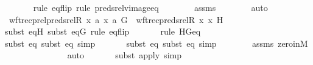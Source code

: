\begin{isabellebody}
\ \ \ \ \ \ \isamarkupfalse%
{\isacharparenleft}{\kern0pt}rule\ eq{\isacharunderscore}{\kern0pt}flip{\isacharcomma}{\kern0pt}\ rule\ preds{\isacharunderscore}{\kern0pt}rel{\isacharunderscore}{\kern0pt}vimage{\isacharunderscore}{\kern0pt}eq{\isacharprime}{\kern0pt}{\isacharparenright}{\kern0pt}\isanewline
\ \ \ \ \ \ \isamarkupfalse%
\ assms\isanewline
\ \ \ \ \ \ \isamarkupfalse%
\ auto\isanewline
\isanewline
\ \ \ \ \isamarkupfalse%
\ {\isachardoublequoteopen}wftrec{\isacharparenleft}{\kern0pt}prel{\isacharparenleft}{\kern0pt}preds{\isacharunderscore}{\kern0pt}rel{\isacharparenleft}{\kern0pt}R{\isacharcomma}{\kern0pt}\ x{\isacharparenright}{\kern0pt}{\isacharcomma}{\kern0pt}\ {\isacharbraceleft}{\kern0pt}a{\isacharbraceright}{\kern0pt}{\isacharparenright}{\kern0pt}{\isacharcomma}{\kern0pt}\ {\isasymlangle}x{\isacharcomma}{\kern0pt}\ a{\isasymrangle}{\isacharcomma}{\kern0pt}\ G{\isacharparenright}{\kern0pt}\ {\isacharequal}{\kern0pt}\ wftrec{\isacharparenleft}{\kern0pt}preds{\isacharunderscore}{\kern0pt}rel{\isacharparenleft}{\kern0pt}R{\isacharcomma}{\kern0pt}\ x{\isacharparenright}{\kern0pt}{\isacharcomma}{\kern0pt}\ x{\isacharcomma}{\kern0pt}\ H{\isacharparenright}{\kern0pt}{\isachardoublequoteclose}\ \isanewline
\ \ \ \ \ \ \isamarkupfalse%
{\isacharparenleft}{\kern0pt}subst\ eqH{\isacharcomma}{\kern0pt}\ subst\ eqG{\isacharcomma}{\kern0pt}\ rule\ eq{\isacharunderscore}{\kern0pt}flip{\isacharparenright}{\kern0pt}\isanewline
\ \ \ \ \ \ \isamarkupfalse%
{\isacharparenleft}{\kern0pt}rule\ HGeq{\isacharparenright}{\kern0pt}\isanewline
\ \ \ \ \ \ \isamarkupfalse%
{\isacharparenleft}{\kern0pt}subst\ eq{}{\isacharprime}{\kern0pt}{\isacharprime}{\kern0pt}{\isacharcomma}{\kern0pt}\ subst\ eq{}{\isacharcomma}{\kern0pt}\ simp{\isacharparenright}{\kern0pt}\isanewline
\ \ \ \ \ \ \isamarkupfalse%
{\isacharparenleft}{\kern0pt}subst\ eq{}{\isacharprime}{\kern0pt}{\isacharprime}{\kern0pt}{\isacharcomma}{\kern0pt}\ subst\ eq{}{\isacharcomma}{\kern0pt}\ simp{\isacharparenright}{\kern0pt}\isanewline
\ \ \ \ \ \ \isamarkupfalse%
\ assms\ zero{\isacharunderscore}{\kern0pt}in{\isacharunderscore}{\kern0pt}M\isanewline
\ \ \ \ \ \ \ \ \ \ \ \ \ \isamarkupfalse%
\ auto{\isacharbrackleft}{\kern0pt}{}{\isacharbrackright}{\kern0pt}\isanewline
\ \ \ \ \ \ \isamarkupfalse%
{\isacharparenleft}{\kern0pt}subst\ apply{\isacharunderscore}{\kern0pt}{}{\isacharcomma}{\kern0pt}\ simp{\isacharparenright}{\kern0pt}{\isacharplus}{\kern0pt}\isanewline

\end{isabellebody}
